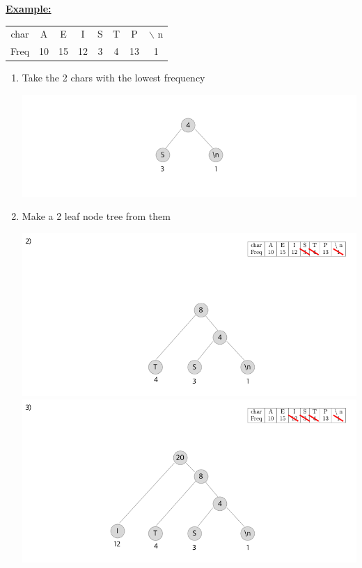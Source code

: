 \documentclass[12pt]{article}
\begin{document}
\begin{enumerate}[1.]
\begin{itemize}
        \bigskip

        \underline{\textbf{Example:}}

        \bigskip

        \begin{tabular}{|c|c|c|c|c|c|c|c|}
            \hline
            char & A & E & I & S & T & P & $\backslash$ n\\
            Freq & 10 & 15 & 12 & 3 & 4& 13 & 1\\
            \hline
        \end{tabular}

        \begin{enumerate}[1.]
            \item Take the 2 chars with the lowest frequency

            \begin{center}
            \includegraphics[width=\linewidth]{images/worksheet_2_solution_13.png}
            \end{center}

            \item Make a 2 leaf node tree from them

            \begin{center}
            \includegraphics[width=\linewidth]{images/worksheet_2_solution_14.png}
            \includegraphics[width=\linewidth]{images/worksheet_2_solution_15.png}
            \end{center}


\end{enumerate}
\end{itemize}
\end{enumerate}
\end{document}

